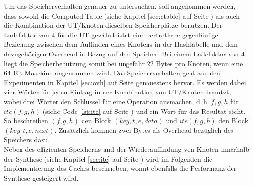 Um das Speicherverhalten genauer zu untersuchen, soll angenommen werden, dass sowohl die Computed-Table (siehe Kapitel \ref{sec:ctable} auf Seite \pageref{sec:ctable}) als auch die Kombination der UT/Knoten dieselben Speicherplätze benutzen. Der Ladefaktor von $4$ für die UT gewährleistet eine vertretbare gegenläufige Beziehung zwischen dem Auffinden eines Knotens in der Hashtabelle und dem dazugehörigen Overhead in Bezug auf den Speicher. Bei einem Ladefaktor von $4$ liegt die Speicherbenutzung somit bei ungefähr $22$ Bytes pro Knoten, wenn eine 64-Bit Maschine angenommen wird. Das Speicherverhalten geht aus den Experimenten in Kapitel \ref{sec:ovh} auf Seite \pageref{sec:ovh} genauestens hervor. Es werden dabei vier Wörter für jeden Eintrag in der Kombination von UT/Knoten benutzt, wobei drei Wörter den Schlüssel für eine Operation ausmachen, d.\,h. $f, g, h$ für $ite(f,g,h)$ (siehe Code \ref{lst:ite} auf Seite \pageref{lst:ite}) und ein Wort für das Resultat steht. So beschreiben $(f,g,h)$ den Block $(key, t, e, data)$ und $ite(f,g,h)$ den Block $(key, t, e, next)$. Zusätzlich kommen zwei Bytes als Overhead bezüglich des Speichers dazu.\\
Neben des effizienten Speicherns und der Wiederauffindung von Knoten innerhalb der Synthese (siehe Kapitel \ref{sec:ite} auf Seite \pageref{sec:ite}) wird im Folgenden die Implementierung des Caches beschrieben, womit ebenfalls die Performanz der Synthese gesteigert wird.

